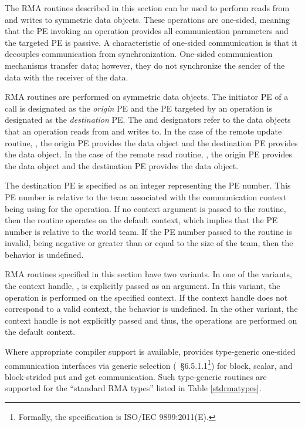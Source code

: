 The \ac{RMA} routines described in this section can be used to perform
reads from and writes to symmetric data objects. These operations
are one-sided, meaning that the \ac{PE} invoking an operation provides all
communication parameters and the targeted \ac{PE} is passive. A characteristic
of one-sided communication is that it decouples communication from
synchronization. One-sided communication mechanisms transfer data; however,
they do not synchronize the sender of the data with the receiver of the data.

\openshmem \ac{RMA} routines are performed on symmetric data objects.  The
initiator \ac{PE} of a call is designated as the \emph{origin} \ac{PE} and the
\ac{PE} targeted by an operation is designated as the \emph{destination} \ac{PE}.  The
\source{} and \dest{} designators refer to the data objects that an operation
reads from and writes to.  In the case of the remote update routine, \PUT{},
the origin \ac{PE} provides the \source{} data object and the destination
\ac{PE} provides the \dest{} data object. In the case of the remote read
routine, \GET{}, the origin \ac{PE} provides the \dest{} data object and the
destination \ac{PE} provides the \source{} data object.

The destination \ac{PE} is specified as an integer representing the \ac{PE} number.
This \ac{PE} number is relative to the team associated with the
communication context being using for the operation. If no context argument is passed to the routine,
then the routine operates on the default context, which implies that
the \ac{PE} number is relative to the world team.
If the \ac{PE} number passed to the routine is invalid, being negative
or greater than or equal to the size of the \openshmem team, then the behavior is undefined.

\openshmem \ac{RMA} routines specified in this section have two variants. In
one of the variants, the context handle, , is explicitly passed as
an argument. In this variant, the operation is performed on the specified
context. If the context handle  does not correspond to a valid
context, the behavior is undefined. In the other variant, the context handle
is not explicitly passed and thus, the operations are performed on the
default context.

Where appropriate compiler support is available, \openshmem provides type-generic
one-sided communication interfaces via \Cstd[11] generic selection
(\Cstd[11]~\S6.5.1.1\footnote{Formally, the \Cstd[11] specification is ISO/IEC 9899:2011(E).})
for block, scalar, and block-strided put and get communication.
Such type-generic routines are supported for the ``standard \ac{RMA} types''
listed in Table \ref{stdrmatypes}.

